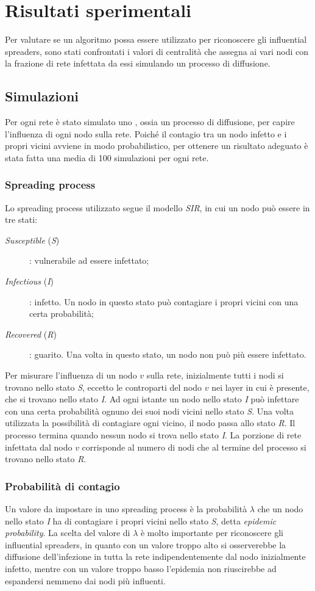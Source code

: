 \chapter{Risultati sperimentali}
Per valutare se un algoritmo possa essere utilizzato per riconoscere gli influential spreaders, 
sono stati confrontati i valori di centralità che assegna ai vari nodi con la frazione di 
rete infettata da essi simulando un processo di diffusione.

\section{Simulazioni}
Per ogni rete è stato simulato uno \spproc, ossia un processo di diffusione, per capire l'influenza 
di ogni nodo sulla rete. Poiché il contagio tra un nodo infetto e i propri vicini avviene in modo 
probabilistico, per ottenere un risultato adeguato è stata fatta una media di \num{100} simulazioni per ogni rete.

\subsection{Spreading process}
Lo spreading process utilizzato segue il modello \emph{SIR}, in cui un nodo può essere in tre stati:
\begin{description}
    \item[\emph{Susceptible} (\emph{S})] : vulnerabile ad essere infettato;
    \item[\emph{Infectious} (\emph{I})] : infetto. Un nodo in questo stato può contagiare
        i propri vicini con una certa probabilità;
    \item[\emph{Recovered} (\emph{R})] : guarito. Una volta in questo stato, un nodo non può più essere
        infettato.
\end{description}
Per misurare l'influenza di un nodo $v$ sulla rete, inizialmente tutti i nodi si trovano nello stato \emph{S}, 
eccetto le controparti del nodo $v$ nei layer in cui è presente, che si trovano nello stato \emph{I}.
Ad ogni istante un nodo nello stato \emph{I} può infettare con una certa probabilità ognuno dei suoi nodi vicini 
nello stato \emph{S}. Una volta utilizzata la possibilità di contagiare ogni vicino, il nodo passa allo stato \emph{R}.
Il processo termina quando nessun nodo si trova nello stato \emph{I}.
La porzione di rete infettata dal nodo $v$ corrisponde al numero di nodi che al termine del processo si trovano nello 
stato \emph{R}.

\subsection{Probabilità di contagio}
\label{sec:epprob}
Un valore da impostare in uno spreading process è la probabilità $\lambda$ che un nodo nello stato \emph{I}
ha di contagiare i propri vicini nello stato \emph{S}, detta \emph{epidemic probability}.
La scelta del valore di $\lambda$ è molto importante per riconoscere gli influential spreaders, 
in quanto con un valore troppo alto si osserverebbe la diffusione dell'infezione in tutta la 
rete indipendentemente dal nodo inizialmente infetto, mentre con un valore troppo basso l'epidemia 
non riuscirebbe ad espandersi nemmeno dai nodi più influenti. 

